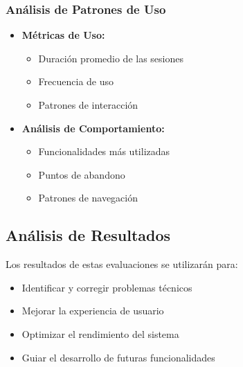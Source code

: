 \subsubsection{Análisis de Patrones de Uso}

\begin{itemize}
	\item \textbf{Métricas de Uso:}
	      \begin{itemize}
		      \item Duración promedio de las sesiones
		      \item Frecuencia de uso
		      \item Patrones de interacción
	      \end{itemize}

	\item \textbf{Análisis de Comportamiento:}
	      \begin{itemize}
		      \item Funcionalidades más utilizadas
		      \item Puntos de abandono
		      \item Patrones de navegación
	      \end{itemize}
\end{itemize}

\subsection{Análisis de Resultados}

Los resultados de estas evaluaciones se utilizarán para:

\begin{itemize}
	\item Identificar y corregir problemas técnicos
	\item Mejorar la experiencia de usuario
	\item Optimizar el rendimiento del sistema
	\item Guiar el desarrollo de futuras funcionalidades
\end{itemize}